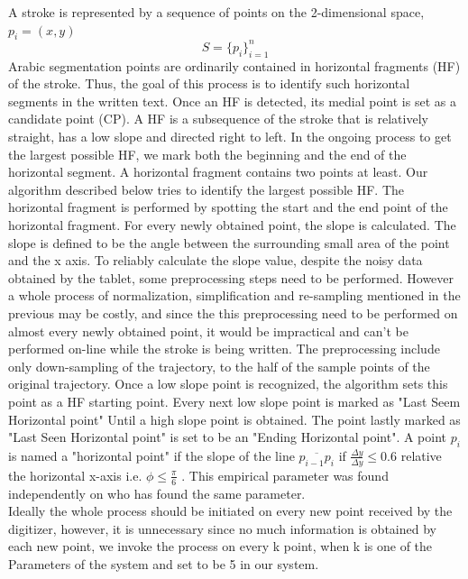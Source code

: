 \documentclass[journal,compsoc]{IEEEtran}
\begin{document}
A stroke is represented by a sequence of points on the 2-dimensional space, $p_{i}=(x,y)$ 
\begin{equation}
S=\{p_{i}\}_{i=1}^{n}
\end{equation}
Arabic segmentation points are ordinarily contained in horizontal fragments (HF) of the stroke. Thus, the goal of this process is to identify such horizontal segments in the written text. Once an HF is detected, its medial point is set as a candidate point (CP). A HF is a subsequence of the stroke that is relatively straight, has a low slope and directed right to left. In the ongoing process to get the largest possible HF, we mark both the beginning and the end of the horizontal segment. A horizontal fragment contains two points at least. Our algorithm described below tries to identify the largest possible HF.
The horizontal fragment is performed by spotting the start and the end point of the horizontal fragment. For every newly obtained point, the slope is calculated. The slope is defined to be the angle between the surrounding small area of the point and the x axis. To reliably calculate the slope value, despite the noisy data obtained by the tablet, some preprocessing steps need to be performed. However a whole process of normalization, simplification and re-sampling mentioned in the previous may be costly, and since the this preprocessing need to be performed on almost every newly obtained point, it would be impractical and can't be performed on-line while the stroke is being written. 
The preprocessing include only down-sampling of the trajectory, to the half of the sample points of the original trajectory.
Once a low slope point is recognized, the algorithm sets this point as a HF starting point. Every next low slope point is marked as "Last Seem Horizontal point" Until a high slope point is obtained. The point lastly marked as "Last Seen Horizontal point" is set to be an "Ending Horizontal point".
A point $p_{i}$ is named a "horizontal point" if the slope of the line $\overline{p_{i-1}p_{i}}$ if $\frac{\Delta y}{\Delta y}\leq0.6$ relative the horizontal x-axis i.e. $\phi \leq \frac{\pi}{6}$ . This empirical parameter was found independently on \cite{daifallah2009recognition} who has found the same parameter. \\

Ideally the whole process should be initiated on every new point received by the digitizer, however, it is unnecessary since no much information is obtained by each new point, we invoke the process on every k point, when k is one of the Parameters of the system and set to be 5 in our system.   
\end{document}
